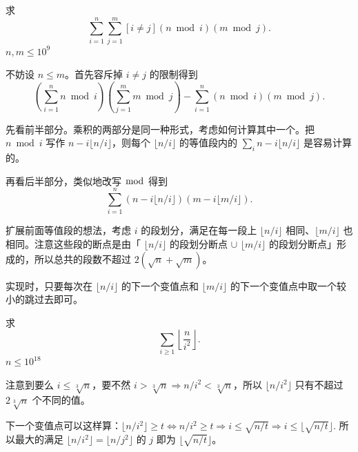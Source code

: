     \begin{example}[模积和]
        求
        $$
        \sum_{i=1}^n\sum_{j=1}^m[i\ne j](n\bmod i)(m\bmod j).
        $$
        $n,m\le 10^9$
    \end{example}
    \begin{solution}
        不妨设 $n\le m$。首先容斥掉 $i\ne j$ 的限制得到
        $$
        \left(\sum_{i=1}^n n\bmod i\right)\left(\sum_{j=1}^m m\bmod j\right)-\sum_{i=1}^n(n\bmod i)(m\bmod j).
        $$

        先看前半部分。乘积的两部分是同一种形式，考虑如何计算其中一个。把 $n\bmod i$ 写作 $n-i\lfloor n/i\rfloor$，则每个 $\lfloor n/i\rfloor$ 的等值段内的 $\sum_i n-i\lfloor n/i\rfloor$ 是容易计算的。

        再看后半部分，类似地改写 $\bmod$ 得到
        $$
        \sum_{i=1}^n (n-i\lfloor n/i\rfloor)(m-i\lfloor m/i\rfloor).
        $$

        扩展前面等值段的想法，考虑 $i$ 的段划分，满足在每一段上 $\lfloor n/i\rfloor$ 相同、$\lfloor m/i\rfloor$ 也相同。注意这些段的断点是由「 $\lfloor n/i\rfloor$ 的段划分断点 $\cup$ $\lfloor m/i\rfloor$ 的段划分断点」形成的，所以总共的段数不超过 $2(\sqrt{n}+\sqrt{m})$。

        实现时，只要每次在 $\lfloor n/i\rfloor$ 的下一个变值点和 $\lfloor m/i\rfloor$ 的下一个变值点中取一个较小的跳过去即可。
    \end{solution}
    \begin{example}
        求
        $$
        \sum_{i\ge 1}\left\lfloor \frac{n}{i^2}\right\rfloor.
        $$
        $n\le 10^{18}$
    \end{example}
    \begin{solution}
        注意到要么 $i\le \sqrt[3]{n}$，要不然 $i>\sqrt[3]{n}\Rightarrow n/i^2<\sqrt[3]{n}$，所以 $\lfloor n/i^2\rfloor$ 只有不超过 $2\sqrt[3]{n}$ 个不同的值。

        下一个变值点可以这样算：$\lfloor n/i^2\rfloor\ge t\Longleftrightarrow n/i^2\ge t\Longrightarrow i\le \sqrt{n/t}\Longrightarrow i\le\lfloor\sqrt{n/t}\rfloor$. 所以最大的满足 $\lfloor n/i^2\rfloor=\lfloor n/j^2\rfloor$ 的 $j$ 即为 $\lfloor\sqrt{n/t}\rfloor$。
    \end{solution}
    



